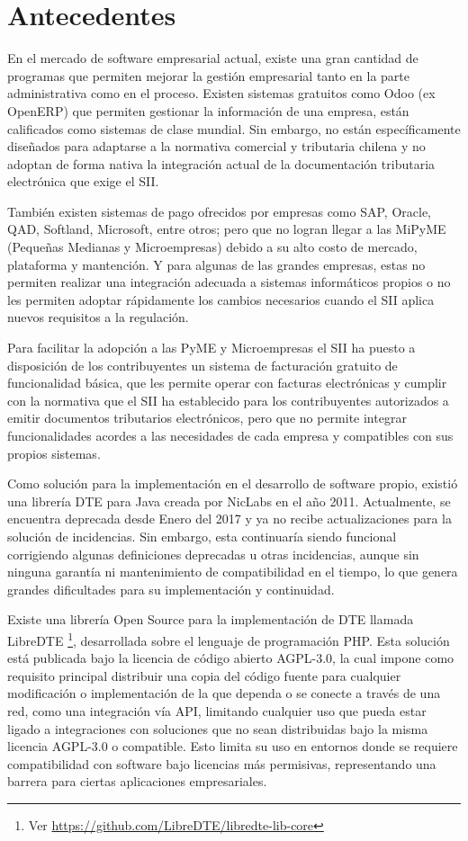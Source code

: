 \section{Antecedentes}

En el mercado de software empresarial actual, existe una gran cantidad de programas que permiten mejorar la gestión empresarial tanto en la parte administrativa como en el proceso. Existen sistemas gratuitos como Odoo (ex OpenERP) que permiten gestionar la información de una empresa, están calificados como sistemas  de clase mundial. Sin embargo, no están específicamente diseñados para adaptarse a la normativa comercial y tributaria chilena y no adoptan de forma nativa la integración actual de la documentación tributaria electrónica que exige el SII.

También existen sistemas de pago ofrecidos por empresas como SAP, Oracle, QAD, Softland, Microsoft, entre otros; pero que no logran llegar a las MiPyME (Pequeñas Medianas y Microempresas) debido a su alto costo de mercado, plataforma y mantención. Y para algunas de las grandes empresas, estas no permiten realizar una integración adecuada a sistemas informáticos propios o no les permiten adoptar rápidamente los cambios necesarios cuando el SII aplica nuevos requisitos a la regulación.

Para facilitar la adopción a las PyME y Microempresas el SII ha puesto a disposición de los contribuyentes un sistema de facturación gratuito de funcionalidad básica, que les permite operar con facturas electrónicas y cumplir con la normativa que el SII ha establecido para los contribuyentes autorizados a emitir documentos tributarios electrónicos, pero que no permite integrar funcionalidades acordes a las necesidades de cada empresa y compatibles con sus propios sistemas.

Como solución para la implementación en el desarrollo de software propio, existió una librería DTE para Java creada por NicLabs en el año 2011. Actualmente, se encuentra deprecada desde Enero del 2017 y ya no recibe actualizaciones para la solución de incidencias. Sin embargo, esta continuaría siendo funcional corrigiendo algunas definiciones deprecadas u otras incidencias, aunque sin ninguna garantía ni mantenimiento de compatibilidad en el tiempo, lo que genera grandes dificultades para su implementación y continuidad.

Existe una librería Open Source para la implementación de DTE llamada LibreDTE \textcite{libreDTEGitHub} \footnote{Ver \url{https://github.com/LibreDTE/libredte-lib-core}}, desarrollada sobre el lenguaje de programación PHP. Esta solución está publicada bajo la licencia de código abierto AGPL-3.0, la cual impone como requisito principal distribuir una copia del código fuente para cualquier modificación o implementación de la que dependa o se conecte a través de una red, como una integración vía API, limitando cualquier uso que pueda estar ligado a integraciones con soluciones que no sean distribuidas bajo la misma licencia AGPL-3.0 o compatible. Esto limita su uso en entornos donde se requiere compatibilidad con software bajo licencias más permisivas, representando una barrera para ciertas aplicaciones empresariales.

